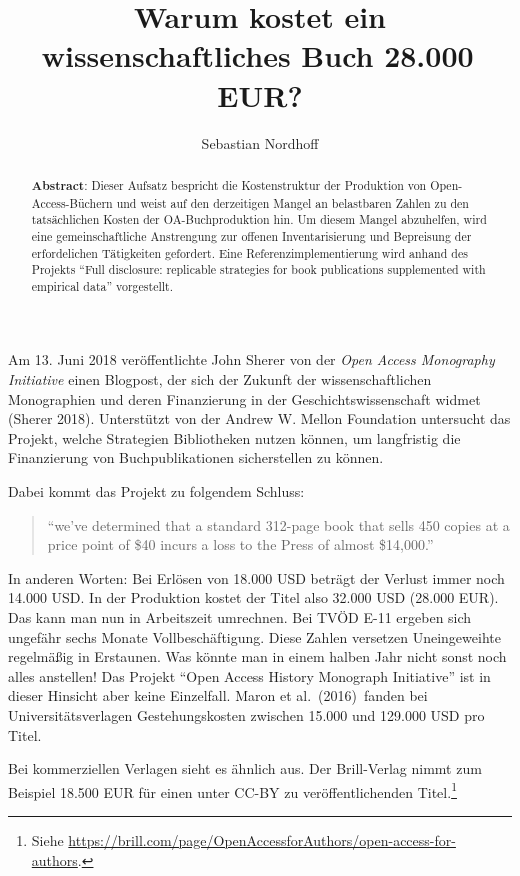 \documentclass[a4paper,
fontsize=11pt,
oneside,
numbers=noperiodatend,
parskip=half-,
bibliography=totoc,
final
]{scrartcl}
\title{\LARGE{Warum kostet ein wissenschaftliches Buch 28.000\,EUR?}}%
\author{Sebastian Nordhoff} %
\date{}
\begin{document}
\maketitle
\thispagestyle{fancyplain} 

\begin{abstract}
\noindent \textbf{Abstract}: Dieser Aufsatz bespricht die Kostenstruktur der
Produktion von Open-Access-Büchern und weist auf den derzeitigen Mangel
an belastbaren Zahlen zu den tatsächlichen Kosten der OA-Buchproduktion
hin. Um diesem Mangel abzuhelfen, wird eine gemeinschaftliche
Anstrengung zur offenen Inventarisierung und Bepreisung der
erfordelichen Tätigkeiten gefordert. Eine Referenzimplementierung wird
anhand des Projekts ``Full disclosure: replicable strategies for book
publications supplemented with empirical data'' vorgestellt.
\end{abstract}

Am 13. Juni 2018 veröffentlichte John Sherer von der \emph{Open Access
Monography Initiative} einen Blogpost, der sich der Zukunft der
wissenschaftlichen Monographien und deren Finanzierung in der
Geschichtswissenschaft widmet (Sherer 2018). Unterstützt von der Andrew
W. Mellon Foundation untersucht das Projekt, welche Strategien
Bibliotheken nutzen können, um langfristig die Finanzierung von
Buchpublikationen sicherstellen zu können.

Dabei kommt das Projekt zu folgendem Schluss:

\begin{quote}
\enquote{we've determined that a standard 312-page book that sells 450
copies at a price point of \$40 incurs a loss to the Press of almost
\$14,000.}
\end{quote}

In anderen Worten: Bei Erlösen von 18.000 USD beträgt der Verlust immer
noch 14.000 USD. In der Produktion kostet der Titel also 32.000 USD
(28.000 EUR). Das kann man nun in Arbeitszeit umrechnen. Bei TVÖD E-11
ergeben sich ungefähr sechs Monate Vollbeschäftigung. Diese Zahlen
versetzen Uneingeweihte regelmäßig in Erstaunen. Was könnte man in einem
halben Jahr nicht sonst noch alles anstellen! Das Projekt \enquote{Open
Access History Monograph Initiative} ist in dieser Hinsicht aber keine
Einzelfall. Maron et al.~(2016)~fanden bei Universitätsverlagen
Gestehungskosten zwischen 15.000 und 129.000 USD pro Titel.

Bei kommerziellen Verlagen sieht es ähnlich aus. Der Brill-Verlag nimmt
zum Beispiel 18.500 EUR für einen unter CC-BY zu veröffentlichenden
Titel.\footnote{Siehe
  \url{https://brill.com/page/OpenAccessforAuthors/open-access-for-authors}.}
\end{document}
